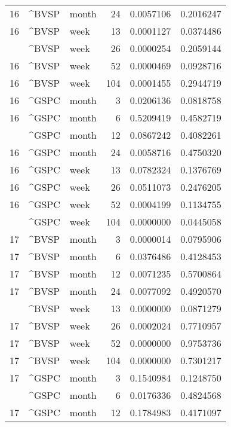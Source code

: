 \begin{tabular}{rllrrr}
16 & \textasciicircum{}BVSP & month & 24 & 0.0057106 & 0.2016247\\
16 & \textasciicircum{}BVSP & week & 13 & 0.0001127 & 0.0374486\\
\addlinespace
16 & \textasciicircum{}BVSP & week & 26 & 0.0000254 & 0.2059144\\
16 & \textasciicircum{}BVSP & week & 52 & 0.0000469 & 0.0928716\\
16 & \textasciicircum{}BVSP & week & 104 & 0.0001455 & 0.2944719\\
16 & \textasciicircum{}GSPC & month & 3 & 0.0206136 & 0.0818758\\
16 & \textasciicircum{}GSPC & month & 6 & 0.5209419 & 0.4582719\\
\addlinespace
16 & \textasciicircum{}GSPC & month & 12 & 0.0867242 & 0.4082261\\
16 & \textasciicircum{}GSPC & month & 24 & 0.0058716 & 0.4750320\\
16 & \textasciicircum{}GSPC & week & 13 & 0.0782324 & 0.1376769\\
16 & \textasciicircum{}GSPC & week & 26 & 0.0511073 & 0.2476205\\
16 & \textasciicircum{}GSPC & week & 52 & 0.0004199 & 0.1134755\\
\addlinespace
16 & \textasciicircum{}GSPC & week & 104 & 0.0000000 & 0.0445058\\
17 & \textasciicircum{}BVSP & month & 3 & 0.0000014 & 0.0795906\\
17 & \textasciicircum{}BVSP & month & 6 & 0.0376486 & 0.4128453\\
17 & \textasciicircum{}BVSP & month & 12 & 0.0071235 & 0.5700864\\
17 & \textasciicircum{}BVSP & month & 24 & 0.0077092 & 0.4920570\\
\addlinespace
17 & \textasciicircum{}BVSP & week & 13 & 0.0000000 & 0.0871279\\
17 & \textasciicircum{}BVSP & week & 26 & 0.0002024 & 0.7710957\\
17 & \textasciicircum{}BVSP & week & 52 & 0.0000000 & 0.9753736\\
17 & \textasciicircum{}BVSP & week & 104 & 0.0000000 & 0.7301217\\
17 & \textasciicircum{}GSPC & month & 3 & 0.1540984 & 0.1248750\\
\addlinespace
17 & \textasciicircum{}GSPC & month & 6 & 0.0176336 & 0.4824568\\
17 & \textasciicircum{}GSPC & month & 12 & 0.1784983 & 0.4171097\\

\end{tabular}
